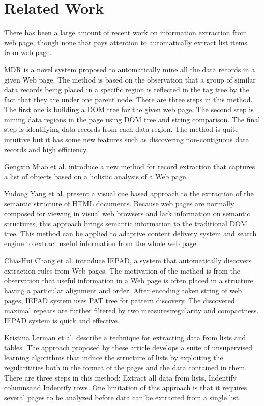 \section{Related Work}

There has been a large amount of recent work on information extraction from web page, though none that pays attention to automatically extract list items from web page.

MDR \cite{LiuGZ03:MDR} is a novel system proposed to automatically mine all the data records in a given Web page. The method is based on the observation that a group of similar data records being placed in a specific region is reflected in the tag tree by the fact that they are under one parent node. There are three steps in this method. The first one is building a DOM tree for the given web page. The second step is mining data regions in the page using DOM tree and string comparison. The final step is identifying data records from each data region. The method is quite intuitive but it  has some new features such as discovering non-contiguous data records and high efficiency.

Gengxin Miao et al. \cite{MiaoTHSM09:TagPathClustering} introduce a new method for record extraction that captures a list of objects based on a holistic analysis of a Web page. 

Yudong Yang et al. \cite{YangZ01:VisualCues} present a visual cue based approach to the extraction of the semantic structure of HTML documents.
Because web pages are normally composed for viewing in visual web browsers and lack information on semantic structures, this approach brings semantic information to the traditional DOM tree.
This method can be applied to adaptive content delivery system and search engine to extract useful information from the whole web page.

Chia-Hui Chang et al. \cite{ChangL01:IEPAD} introduce IEPAD, a system that automatically discovers extraction rules from Web pages. The motivation of the method is from the observation that useful information in a Web page is often placed in a structure having a particular alignment and order. After encoding token string of web pages, IEPAD system uses PAT tree for pattern discovery. The discovered maximal repeats are further filtered by two measures:regularity and compactness. IEPAD system is quick and effective.

Kristina Lerman et al.\cite{Lerman01:AutomaticData} describe a technique for extracting data from lists and tables. The approach proposed by these article develops a suite of unsupervised learning algorithms that induce the structure of lists by exploiting the regularitities both in the format of the pages and the data contained in them. There are three steps in this method: Extract all data from lists, Indentify columnsand Indentify rows. One limitation of this approach is that it requires several pages to be analyzed before data can be extracted from a single list.

